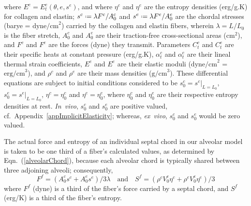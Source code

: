 where $E^e = E^e_t ( \theta , e , s^e )$, and where $\eta^c$ and $\eta^e$ are the entropy densities (erg/g.K) for collagen and elastin; $s^c \defeq \lambda F^c / A^c_0$ and $s^e \defeq \lambda F^e / A_0^e$ are the chordal stresses (barye = $\text{dyne/cm}^2$) carried by the collagen and elastin fibers, wherein $\lambda = L/L_0$ is the fiber stretch, $A^c_0$ and $A^e_0$ are their traction-free cross-sectional areas ($\text{cm}^2$), and $F^c$ and $F^e$ are the forces (dyne) they transmit.  Parameters $C^c_t$ and $C^e_t$ are their specific heats at constant pressure (erg/g.K), $\alpha^c_t$ and $\alpha^e_t$ are their lineal thermal strain coefficients, $E^e$ and $E^e$ are their elastic moduli ($\text{dyne/cm}^2$ = $\text{erg/cm}^3$), and $\rho^c$ and $\rho^e$ are their mass densities ($\text{g/cm}^3$).  These differential equations are subject to initial conditions considered to be $s^c_0 = s^c |_{L = L_0}$, $s^e_0 = s^e |_{L = L_0}$, $\eta^c = \eta^c_0$ and $\eta^e = \eta^e_0$, where  $\eta_0^c$ and $\eta_0^e$ are their respective entropy densities at rest.  \textit{In~vivo}, $s^c_0$ and $s^e_0$ are positive valued, cf.\ Appendix~\ref{appImplicitElasticity}; whereas, \textit{ex~vivo}, $s^c_0$ and $s^e_0$ would be zero valued.  

The actual force and entropy of an individual septal chord in our alveolar model is taken to be one third of a fiber's calculated values, as determined by Eqn.~(\ref{alveolarChord}), because each alveolar chord is typically shared between three adjoining alveoli; consequently, 
\begin{equation}
    \label{septalChordCEs}
    F^f = ( A_0^c s^c + A_0^e s^e ) / 3 \lambda 
    \quad \text{and} \quad
    S^f = ( \rho^c V_0^c \eta^c + \rho^e V_0^e \eta^e ) / 3 
\end{equation}  
where $F^f$ (dyne) is a third of the fiber's force carried by a septal chord, and $S^f$ (erg/K) is a third of the fiber's entropy.

